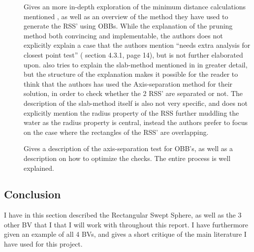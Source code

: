 \begin{description}
\item[\cite{Larsen99fastproximity}] Gives an more in-depth exploration of the minimum distance calculations mentioned \cite{larsen00fast}, as well as an overview of the method they have used to generate the RSS' using OBBs. While the explanation of the pruning method both convincing and implementable, the authors does not explicitly explain a case that the authors mention ``needs extra analysis for closest point test'' (\cite{Larsen99fastproximity} section 4.3.1, page 14), but is not further elaborated upon. \cite{Larsen99fastproximity} also tries to explain the slab-method mentioned in \cite{larsen00fast} in greater detail, but the structure of the explanation makes it possible for the reader to think that the authors has used the Axis-separation method for their solution, in order to check whether the 2 RSS' are separated or not. The description of the slab-method itself is also not very specific, and does not explicitly mention the radius property of the RSS further muddling the water as the radius property is central, instead the authors prefer to focus on the case where the rectangles of the RSS' are overlapping.

\item[\cite{237244}] Gives a description of the axis-separation test for OBB's, as well as a description on how to optimize the checks. The entire process is well explained.
\end{description}

\subsection{Conclusion}
I have in this section described the Rectangular Swept Sphere, as well as the 3 other BV that I that I will work with throughout this report. I have furthermore given an example of all 4 BVs, and gives a short critique of the main literature I have used for this project.
